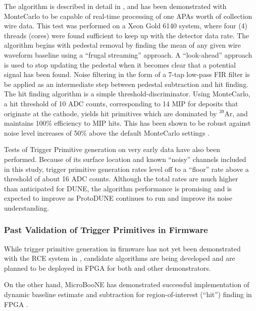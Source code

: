 The algorithm is described in detail in \cite{docid-11236}, and has been
demonstrated with MonteCarlo to be capable of real-time processing of one APAs worth
of collection wire data. This test was performed on a Xeon Gold 6140
system, where four (4) threads (cores) were found sufficient to keep
up with the detector data rate. The algorithm begins with pedestal removal by
finding the mean of any given wire waveform baseline using a ``frugal
streaming'' approach. A ``look-ahead'' approach is used to stop
updating the pedestal when it becomes clear that a potential signal
has been found. Noise filtering in the form of a 7-tap low-pass FIR
filter is be applied as an intermediate step
between pedestal subtraction and hit finding. The hit finding
algorithm is a simple threshold-discriminator. Using MonteCarlo, a hit
threshold of 10 ADC counts, corresponding to 1\/4 MIP for deposits that
originate at the cathode, yields hit primitives which are dominated by
$^39$Ar, and maintains 100\% efficiency to MIP hits. This has been
shown to be robust against noise level 
increases of 50\% above the default  MonteCarlo settings \cite{docid-11275}. 

Tests of Trigger Primitive generation on very early  data have also been
performed. Because of its surface
location and known ``noisy'' channels included in this study,
 trigger primitive generation rates level off to a ``floor'' rate above a threshold
of about 16 ADC counts. Although the total rates are much higher than
anticipated for DUNE, the algorithm performance is promising and is
expected to improve as ProtoDUNE continues
to run and improve its noise understanding.

\subsubsection{Past Validation of Trigger Primitives in Firmware}
\label{sec:sp-daq:validation-firmware-trigger-primitives}

While trigger primitive generation in firmware has not yet been
demonstrated with the RCE system in , candidate
algorithms are being developed and are planned to be deployed in FPGA
for both  and other demonstrators. 

On the other hand, MicroBooNE has demonstrated
successful implementation of dynamic baseline estimate and subtraction
for region-of-interest (``hit'') finding in FPGA \cite{NNN18}.

